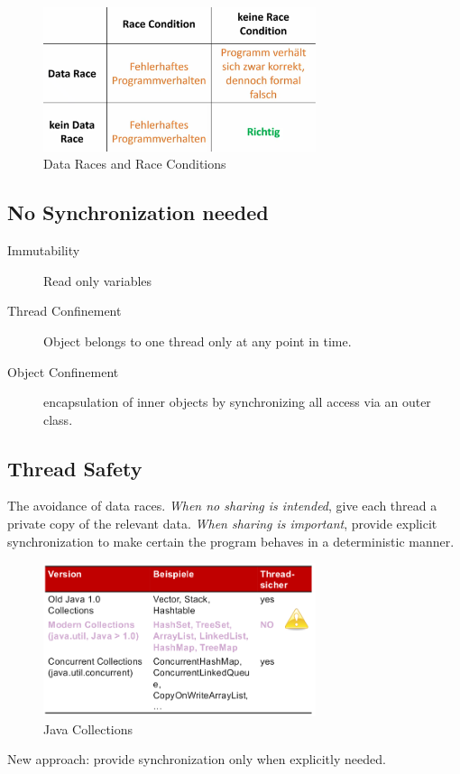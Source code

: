 \begin{figure}
  \centering
  \includegraphics[width=8cm]{res/04-datarace-raceconditions.png}
  \caption{Data Races and Race Conditions}
\end{figure}

\subsection{No Synchronization needed}
\begin{description}
  \item[Immutability] Read only variables
  \item[Thread Confinement] Object belongs to one thread only at any point in time.
  \item[Object Confinement] encapsulation of inner objects by synchronizing all access via an outer class. 
\end{description}

\subsection{Thread Safety}
The avoidance of data races. \textit{When no sharing is intended}, give each thread a private copy of the relevant data.
\textit{When sharing is important}, provide explicit synchronization to make certain the program behaves in a deterministic manner.

\begin{figure}[H]
  \centering
  \includegraphics[width=8cm]{res/04-thread-safe-collections.png}
  \caption{Java Collections}
\end{figure}

New approach: provide synchronization only when explicitly needed.
